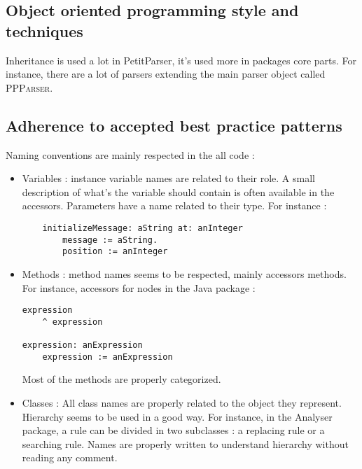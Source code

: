 \subsection{Object oriented programming style and techniques}
Inheritance is used a lot in PetitParser, it's used more in packages core parts. For instance, there are a lot of parsers extending the main parser object called \textsc{PPParser}. \\

\subsection{Adherence to accepted best practice patterns}
Naming conventions are mainly respected in the all code : 
\begin{itemize}
\item Variables : instance variable names are related to their role. A small description of what's the variable should contain is often available in the accessors. Parameters have a name related to their type. For instance :
\begin{lstlisting}
	initializeMessage: aString at: anInteger
		message := aString.
		position := anInteger
\end{lstlisting}
\item Methods : method names seems to be respected, mainly accessors methods. For instance, accessors for nodes in the Java package :
\begin{lstlisting}
expression
	^ expression
	
expression: anExpression
	expression := anExpression
\end{lstlisting}
Most of the methods are properly categorized. 

\item Classes : All class names are properly related to the object they represent. Hierarchy seems to be used in a good way. For instance, in the Analyser package, a rule can be divided in two subclasses : a replacing rule or a searching rule. Names are properly written to understand hierarchy without reading any comment.
\end{itemize}




